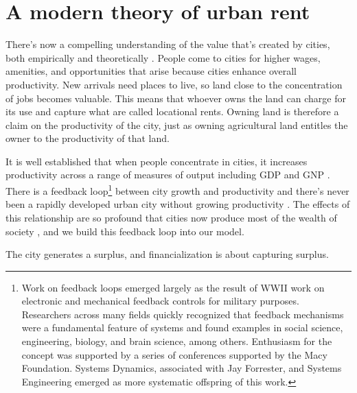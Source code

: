 \section{A modern theory of urban rent}
There's now a compelling understanding of the value that's created by cities, both empirically and theoretically \cite{jacobsEconomyCities1969, spenceUrbanizationGrowth2009, bettencourtIntroductionUrbanScience2021}. 
People come to cities for higher wages, amenities, and opportunities that arise because cities enhance overall productivity. New arrivals need places to live, so land close to the concentration of jobs becomes valuable. This means that whoever owns the land can charge for its use and capture what are called \glspl{locational rent}. Owning land is therefore a claim on the productivity of the city, just as owning agricultural land entitles the owner to the productivity of that land. %

It is well established that when people concentrate in cities, it increases productivity across a range of measures of output including GDP and GNP \cite{bettencourtIntroductionUrbanScience2021}.  There is a feedback loop\footnote{Work on feedback loops emerged largely as the result of WWII work on electronic and mechanical feedback controls for military purposes. Researchers across many fields %
quickly recognized that feedback mechanisms were a fundamental feature of systems and found examples in social science, engineering, biology, and brain science, among others. Enthusiasm for the concept was supported by a series of conferences supported by the Macy Foundation. %
Systems Dynamics, associated with Jay Forrester, and Systems Engineering emerged as more systematic offspring of this work.} %
between city growth and productivity and there's never been a rapidly developed urban city without growing productivity \cite{annezUrbanizationGrowthSetting2009}.  %
The effects of this relationship are so profound that cities now produce most of the wealth of society \cite{GET_cities-most-of-wealth}, and we build this feedback loop into our model.  


The city generates a surplus, and financialization is about capturing surplus. 




